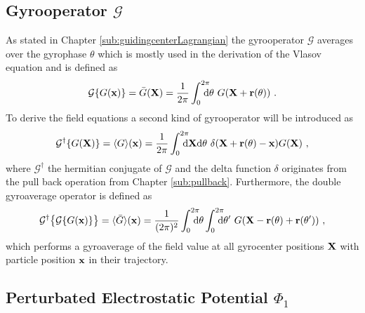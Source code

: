 
\subsection{Gyrooperator $\mathcal{G}$}
\label{sub:gyroOperator}

As stated in Chapter \ref{sub:guidingcenterLagrangian} the gyrooperator $\mathcal{G}$ averages over the gyrophase $\theta$ which is mostly used in the derivation of the Vlasov equation and is defined as
\begin{gather}
    \mathcal{G} \{G(\boldsymbol{\mathbf{x}})\} = \bar{G}(\boldsymbol{\mathbf{X}}) = \frac{1}{2\pi} \int_{0}^{2\pi} \!\!\!\!\! \mathrm{d}\theta ~ G(\boldsymbol{\mathbf{X}} + \boldsymbol{\mathbf{r}}(\theta))~.
    \label{eq:gyroOperatorRevision}
\end{gather}
To derive the field equations a second kind of gyrooperator will be introduced as
\begin{gather}
    \mathcal{G}^\dagger \{G(\boldsymbol{\mathbf{X}})\} = \langle G\rangle(\boldsymbol{\mathbf{x}}) = \frac{1}{2\pi} \int_{0}^{2\pi} \!\!\!\!\! \mathrm{d}\boldsymbol{\mathbf{X}}\mathrm{d}\theta ~ \delta(\boldsymbol{\mathbf{X}} + \boldsymbol{\mathbf{r}}(\theta) - \boldsymbol{\mathbf{x}}) G(\boldsymbol{\mathbf{X}})~,
    \label{eq:gyroOperatorDagger}
\end{gather}
where $\mathcal{G}^\dagger$ the hermitian conjugate of $\mathcal{G}$\cite{Told_PHD} and the delta function $\delta$ originates from the pull back operation from Chapter \ref{sub:pullback}.\cite{Merlo_PHD} Furthermore, the double gyroaverage operator is defined as
\begin{gather}
    \tgad{\bigl\{ \tga{\{G(\x)\}} \bigr\}} = \gad{\ga{G}}(\x) = \frac{1}{(2\pi)^2} \intss{0}{2\pi} \dtheta \intss{0}{2\pi} \dtheta' ~ G(\X - \rrho(\theta) + \rrho(\theta'))~,
    \label{eq:gyroOperatorDouble}
\end{gather}
which performs a gyroaverage of the field value at all gyrocenter positions $\boldsymbol{\mathbf{X}}$ with particle position $\boldsymbol{\mathbf{x}}$ in their trajectory. \cite{Maurer_PHD}
\newpage

\subsection{Perturbated Electrostatic Potential $\Phi_1$}
\label{sub:fieldPotential}

